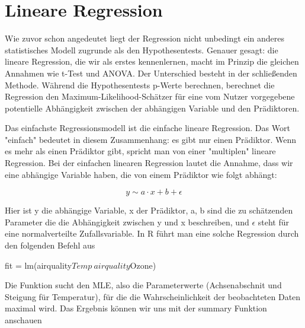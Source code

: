 \documentclass[a4paper,twoside]{tufte-book}\usepackage[]{graphicx}\usepackage[]{color}
\begin{document}
\section{Lineare Regression}

Wie zuvor schon angedeutet liegt der Regression nicht unbedingt ein anderes statistisches Modell zugrunde als den Hypothesentests. Genauer gesagt: die lineare Regression, die wir als erstes kennenlernen, macht im Prinzip die gleichen Annahmen wie t-Test und ANOVA. Der Unterschied besteht in der schließenden Methode. Während die Hypothesentests p-Werte berechnen, berechnet die Regression den Maximum-Likelihood-Schätzer für eine vom Nutzer vorgegebene potentielle Abhängigkeit zwischen der abhängigen Variable und den Prädiktoren.

Das einfachste Regressionsmodell ist die einfache lineare Regression. Das Wort "einfach" bedeutet in diesem Zusammenhang: es gibt nur einen Prädiktor. Wenn es mehr als einen Prädiktor gibt, spricht man von einer "multiplen" lineare Regression. Bei der einfachen linearen Regression lautet die Annahme, dass wir eine abhängige Variable haben, die von einem Prädiktor wie folgt abhängt:

\begin{equation} \label{eq: linear regression}
y \sim a \cdot x + b + \epsilon 
\end{equation}

Hier ist y die abhängige Variable, x der Prädiktor, a, b sind die zu schätzenden Parameter die die Abhängigkeit zwischen y und x beschreiben, und  $\epsilon$ steht für eine normalverteilte Zufallsvariable. In R führt man eine solche Regression durch den folgenden Befehl aus

\begin{Schunk}
\begin{Sinput}
fit = lm(airquality$Temp~airquality$Ozone)
\end{Sinput}
\end{Schunk}

Die Funktion sucht den MLE, also die Parameterwerte (Achsenabschnit und Steigung für Temperatur), für die die Wahrscheinlichkeit der beobachteten Daten maximal wird. Das Ergebnis können wir uns mit der summary Funktion anschauen
\end{document}
